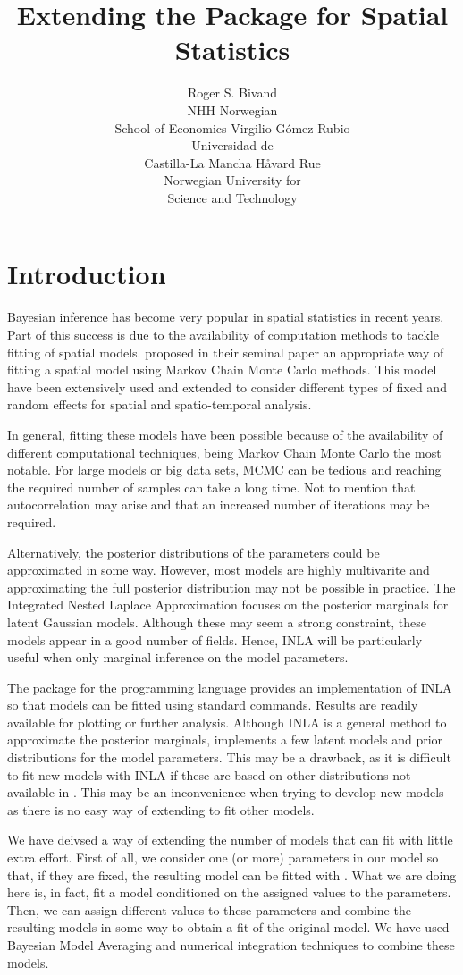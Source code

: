 \documentclass[article]{jss}
\author{Roger S. Bivand\\NHH Norwegian\\ School of Economics \And 
Virgilio G\'omez-Rubio\\Universidad de\\ Castilla-La Mancha 
\And H\r{a}vard Rue\\Norwegian University for\\ Science and Technology
}
\title{Extending the \pkg{R-INLA} Package for Spatial Statistics}
\begin{document}
\section[Introduction]{Introduction}


Bayesian inference has become very popular in spatial statistics in recent
years. Part of this success is due to the availability of computation methods
to tackle fitting of spatial models. \citet{besagetal:1991} proposed in their
seminal paper an appropriate way of fitting a spatial model using Markov Chain
Monte Carlo methods. This model have been extensively used and extended to
consider different types of fixed and random effects for spatial and
spatio-temporal analysis.

In general, fitting these models have been possible because of the availability
of different computational techniques, being Markov Chain Monte Carlo the most
notable. For large models or big data sets, MCMC can be tedious and reaching
the required number of samples can take a long time. Not to mention that
autocorrelation may arise and that an increased number of iterations may be
required.

Alternatively, the posterior distributions of the parameters could be
approximated in some way. However, most models are highly multivarite and
approximating the full posterior distribution may not be possible in practice.
The Integrated Nested Laplace Approximation \citep[][INLA]{isi:000264374200002} focuses on
the posterior marginals for latent Gaussian models. Although these may seem
a strong constraint, these models appear in a good number of fields. 
Hence, INLA will be particularly useful when  only
marginal inference on the model parameters.

The  package\citep{rinla:2013} for the  programming language provides
an implementation of INLA so that models can be fitted using standard 
 commands. Results are readily available for plotting or
further analysis. Although INLA is a general method to approximate the
posterior marginals,  implements a few latent models and prior
distributions for the model parameters.
This may be a drawback, as it is difficult to fit new models with INLA if these
are based on other distributions not available in .  This may be an
inconvenience when trying to develop new models as there is no easy way of
extending  to fit other models.

We have deivsed a way of extending the number of models that  can
fit with little extra effort. First of all, we consider one (or more)
parameters in our model so that, if they are fixed, the resulting model can be
fitted with . What we are doing here is, in fact, fit a model
conditioned on the assigned values to the parameters. Then, we can assign
different values to these parameters and combine the resulting models in some
way to obtain a fit of the original model. We have used Bayesian Model
Averaging and numerical integration techniques to combine these models.
\end{document}
